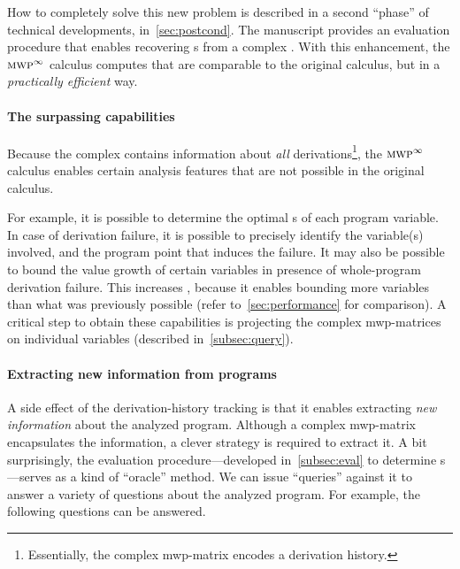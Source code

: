 How to completely solve this new problem is described in a second
\enquote{phase} of technical developments, in~\autoref{sec:postcond}. The
manuscript provides an {evaluation procedure} that enables recovering
s from a complex . With this enhancement, the
\(\textnormal{\textsc{mwp}}^\infty\) calculus computes  that are
comparable to the original calculus, but in a \emph{practically efficient} way.

\paragraph*{The surpassing capabilities}
Because the complex  contains information about \emph{all}
derivations\footnote{Essentially, the complex mwp-matrix encodes a derivation
history.}, the \(\textnormal{\textsc{mwp}}^\infty\) calculus enables certain analysis
features that are not possible in the original calculus.

For example, it is possible to determine the optimal s of each
program variable. In case of derivation failure, it is possible to precisely
identify the variable(s) involved, and the program point that induces the
failure. It may also be possible to bound the value growth of certain variables
in presence of whole-program derivation failure. This increases
, because it enables bounding more variables than what was
previously possible (refer to~\autoref{sec:performance} for comparison). A
critical step to obtain these capabilities is projecting the complex
mwp-matrices on individual variables (described
in~\autoref{subsec:query}).

\paragraph*{Extracting new information from programs}
A side effect of the derivation-history tracking is that it enables extracting
\emph{new information} about the analyzed program. Although a complex mwp-matrix
encapsulates the information, a clever strategy is required to extract it. A bit
surprisingly, the evaluation procedure---developed in~\autoref{subsec:eval} to
determine s---serves as a kind of \enquote{oracle} method. We can
issue \enquote{queries} against it to answer a variety of questions about the
analyzed program. For example, the following questions can be answered.

